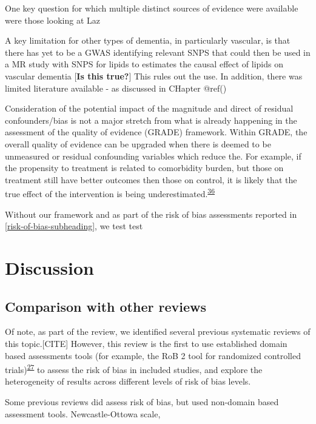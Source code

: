 \documentclass[a4paper, twoside]{templates/ociamthesis}
\begin{document}
One key question for which multiple distinct sources of evidence were available were those looking at Laz

A key limitation for other types of dementia, in particularly vascular, is that there has yet to be a GWAS identifying relevant SNPS that could then be used in a MR study with SNPS for lipids to estimates the causal effect of lipids on vascular dementia {[}\textbf{Is this true?}{]} This rules out the use. In addition, there was limited literature available - as discussed in CHapter @ref()

Consideration of the potential impact of the magnitude and direct of residual confounders/bias is not a major stretch from what is already happening in the assessment of the quality of evidence (GRADE) framework. Within GRADE, the overall quality of evidence can be upgraded when there is deemed to be unmeasured or residual confounding variables which reduce the. For example, if the propensity to treatment is related to comorbidity burden, but those on treatment still have better outcomes then those on control, it is likely that the true effect of the intervention is being underestimated.\textsuperscript{\protect\hyperlink{ref-guyatt2011}{36}}

Without our framework and as part of the risk of bias assessments reported in \ref{risk-of-bias-subheading}, we test test

\hypertarget{discussion-1}{%
\section{Discussion}\label{discussion-1}}

\hypertarget{comparison-with-other-reviews}{%
\subsection{Comparison with other reviews}\label{comparison-with-other-reviews}}

Of note, as part of the review, we identified several previous systematic reviews of this topic.{[}CITE{]} However, this review is the first to use established domain based assessments tools (for example, the RoB 2 tool for randomized controlled trials)\textsuperscript{\protect\hyperlink{ref-sterne2019}{27}} to assess the risk of bias in included studies, and explore the heterogeneity of results across different levels of risk of bias levels.

Some previous reviews did assess risk of bias, but used non-domain based assessment tools. Newcastle-Ottowa scale,
\end{document}
